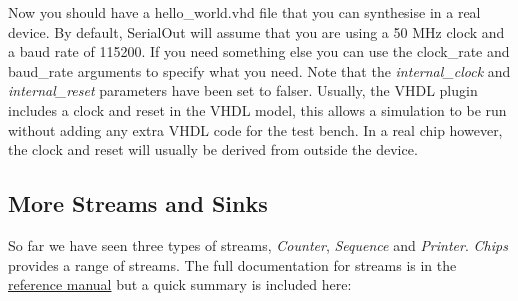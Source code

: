 \documentclass[letterpaper,10pt,english]{sphinxmanual}
\begin{document}
Now you should have a hello\_world.vhd file that you can synthesise in a real
device. By default, SerialOut will assume that you are using a 50 MHz clock and
a baud rate of 115200. If you need something else you can use the clock\_rate
and baud\_rate arguments to specify what you need. Note that the
\emph{internal\_clock} and \emph{internal\_reset} parameters have been set to falser.
Usually, the VHDL plugin includes a clock and reset in the VHDL model, this
allows a simulation to be run without adding any extra VHDL code for the test
bench. In a real chip however, the clock and reset will usually be derived from
outside the device.


\subsection{More Streams and Sinks}
\label{tutorial/index:more-streams-and-sinks}
So far we have seen three types of streams, \emph{Counter}, \emph{Sequence} and
\emph{Printer}. \emph{Chips} provides a range of streams. The full documentation for
streams is in the \href{http://dawsonjon.github.com/chips/language\_reference/}{reference manual} but a quick summary is included here:
\end{document}
